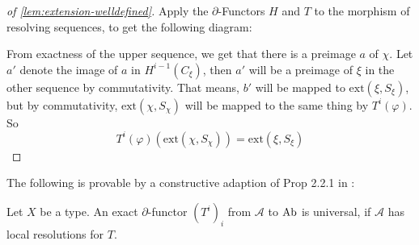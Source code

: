 \begin{proof}[of \cref{lem:extension-welldefined}]
  Apply the $\partial$-Functors $H$ and $T$ to the morphism of resolving sequences, to get the following diagram:
  \begin{center}
  \end{center}
  From exactness of the upper sequence, we get that there is a preimage $a$ of $\chi$.
  Let $a'$ denote the image of $a$ in $H^{i-1}(C_\xi)$,
  then $a'$ will be a preimage of $\xi$ in the other sequence by commutativity.
  That means, $b'$ will be mapped to $ \mathrm{ext}(\xi,S_\xi)$,
  but by commutativity, $\mathrm{ext}(\chi,S_\chi)$ will be mapped to the same thing by $T^i(\varphi)$.
  So
  \[ T^i(\varphi)(\mathrm{ext}(\chi,S_\chi))=\mathrm{ext}(\xi,S_\xi)\]  
\end{proof}


The following is provable by a constructive adaption of Prop 2.2.1 in \cite{tohoku-translation}:
\begin{theorem}
  \label{thm:universal}
  Let $X$ be a type.
  An exact $\partial$-functor $(T^i)_i$ from $\mathcal A$ to $\operatorname{Ab}$ is universal,
  if $\mathcal A$ has local resolutions for $T$.
\end{theorem}


